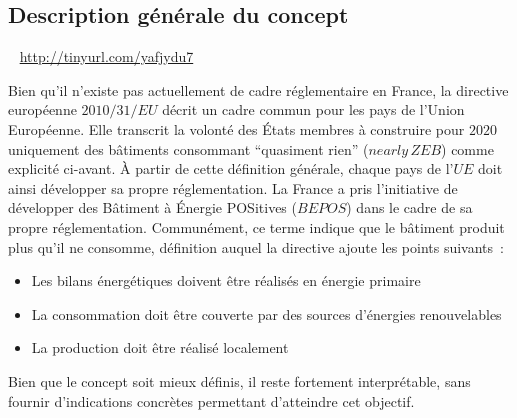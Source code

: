 



\subsection{Description générale du concept} %
\label{sub:description_generale_du_concept}
~
\href{Further development of EU energy efficiency policies}{http://tinyurl.com/yafjydu7}


Bien qu’il n’existe pas actuellement de cadre réglementaire en France,
la directive européenne $2010/31/EU$ \parencite{EPBD2010} décrit un cadre commun pour les pays
de l’Union Européenne. Elle transcrit la volonté des États membres à construire pour $2020$
uniquement des bâtiments consommant \enquote{quasiment rien} ($nearly\,ZEB$) comme explicité ci-avant.
À partir de cette définition générale, chaque pays de l’$UE$ doit ainsi développer sa
propre réglementation. La France a pris l’initiative de développer des Bâtiment à
Énergie POSitives ($BEPOS$) dans le cadre de sa propre réglementation. Communément,
ce terme indique que le bâtiment produit plus qu’il ne consomme, définition
auquel la directive ajoute les points suivants~:
\begin{itemize}
    \item Les bilans énergétiques doivent être réalisés en énergie primaire
    \item La consommation doit être couverte par des sources d’énergies renouvelables
    \item La production doit être réalisé localement
\end{itemize}
Bien que le concept soit mieux définis, il reste fortement interprétable,
sans fournir d’indications concrètes permettant d’atteindre cet objectif.

